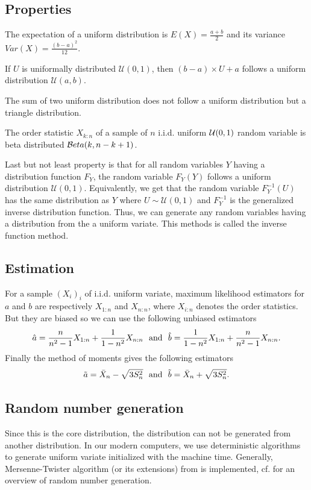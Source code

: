 \subsection{Properties}
The expectation of a uniform distribution is $E(X) = \frac{a+b}{2}$ and its variance $Var(X)=\frac{(b-a)^2}{12}.$

If $U$ is uniformally distributed $\mathcal U(0,1)$, then $(b-a) \times U + a$ follows a uniform distribution $\mathcal U(a,b)$.

The sum of two uniform distribution does not follow a uniform distribution but a triangle distribution.

The order statistic $X_{k:n}$ of a sample of $n$ i.i.d. uniform $\mathcal U(0,1)$ random variable is beta distributed $\mathcal Beta(k, n-k+1)$.

Last but not least property is that for all random variables $Y$ having a distribution function $F_Y$, the random variable $F_Y(Y)$ follows a uniform distribution $\mathcal U(0,1)$. Equivalently, we get that the random variable $F_Y^{-1}(U)$ has the same distribution as $Y$ where $U\sim \mathcal U(0,1)$ and $F_Y^{-1}$ is the generalized inverse distribution function. Thus, we can generate any random variables having a distribution from the a uniform variate. This methods is called the inverse function method.


\subsection{Estimation}
For a sample $(X_i)_i$ of i.i.d. uniform variate, maximum likelihood estimators for $a$ and $b$ are respectively $X_{1:n}$ and $X_{n:n}$, where $X_{i:n}$ denotes the order statistics. But they are biased so we can use the following unbiased estimators
$$
\hat a = \frac{n}{n^2-1} X_{1:n} + \frac{1}{1-n^2}X_{n:n} \textrm{~~and~~}
\hat b = \frac{1}{1-n^2} X_{1:n} + \frac{n}{n^2-1}X_{n:n}.
$$
Finally the method of moments gives the following estimators
$$
\tilde a = \bar X_n -\sqrt{3 S_n^2} \textrm{~~and~~} \tilde b = \bar X_n +\sqrt{3 S_n^2}.
$$

\subsection{Random number generation}
Since this is the core distribution, the distribution can not be generated from another distribution. In our modern computers, we use deterministic algorithms to generate uniform variate initialized with the machine time. Generally, Mersenne-Twister algorithm (or its extensions) from \cite{matsumoto98} is implemented, cf. \cite{dutangc08} for an overview of random number generation.

